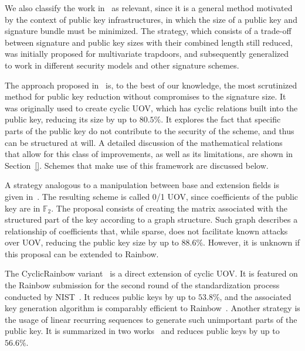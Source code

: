 \documentclass[draft, 12pt, a4paper, oneside]{memoir}
\theoremstyle{definition}
\theoremstyle{remark}
\begin{document}
We also classify the work in~\cite{Szepieniec:201706} as relevant, since it is a general method motivated by the context of public key infrastructures, in which the size of a public key and signature bundle must be minimized. The strategy, which consists of a trade-off between signature and public key sizes with their combined length still reduced, was initially proposed for multivariate trapdoors, and subsequently generalized~\cite{Beullens:201808} to work in different security models and other signature schemes.

The approach proposed in~\cite{Petzoldt:201006} is, to the best of our knowledge, the most scrutinized method for public key reduction without compromises to the signature size. It was originally used to create cyclic UOV, which has cyclic relations built into the public key, reducing its size by up to $80.5\%$. It explores the fact that specific parts of the public key do not contribute to the security of the scheme, and thus can be structured at will. A detailed discussion of the mathematical relations that allow for this class of improvements, as well as its limitations, are shown in Section~\ref{}. Schemes that make use of this framework are discussed below. 


A strategy analogous to a manipulation between base and extension fields is given in~\cite{Petzoldt:201109}. The resulting scheme is called 0/1 UOV, since coefficients of the public key are in $\mathbb{F}_{2}$. The proposal consists of creating the matrix associated with the structured part of the key according to a graph structure. Such graph describes a relationship of coefficients that, while sparse, does not facilitate known attacks over UOV, reducing the public key size by up to $88.6\%$. However, it is unknown if this proposal can be extended to Rainbow.

The CyclicRainbow variant~\cite{Petzoldt:201012} is a direct extension of cyclic UOV. It is featured on the Rainbow submission for the second round of the standardization process conducted by NIST~\cite{Ding:201901}. It reduces public keys by up to $53.8\%$, and the associated key generation algorithm is comparably efficient to Rainbow~\cite{Petzoldt:202004}. Another strategy is the usage of linear recurring sequences to generate such unimportant parts of the public key. It is summarized in two works~\cite{Petzoldt:201103,Petzoldt:201211} and reduces public keys by up to $56.6\%$. 
\end{document}
